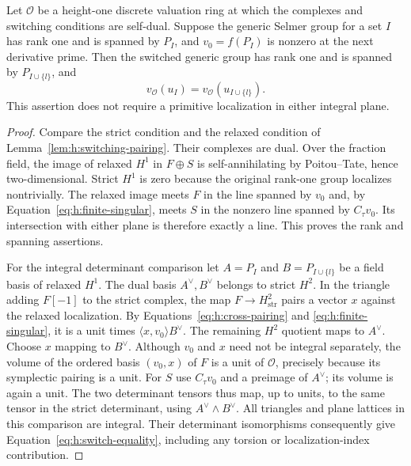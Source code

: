 \begin{lemma}
\label{lem:h:determinant-switch}
Let $\mathcal O$ be a height-one discrete valuation ring at which the
complexes and switching conditions are self-dual. Suppose the generic
Selmer group for a set $I$ has rank one and is spanned by $P_I$, and
$v_0=f(P_I)$ is nonzero at the next derivative prime. Then the switched
generic group has rank one and is spanned by $P_{I\cup\{l\}}$, and
\begin{equation}\label{eq:h:switch-equality}
 v_{\mathcal O}(u_I)=v_{\mathcal O}(u_{I\cup\{l\}}).
\end{equation}
This assertion does not require a primitive localization in either
integral plane.
\end{lemma}

\begin{proof}
Compare the strict condition and the relaxed condition of
Lemma~\ref{lem:h:switching-pairing}. Their complexes are dual. Over the
fraction field, the image of relaxed $H^1$ in $F\oplus S$ is
self-annihilating by Poitou--Tate, hence two-dimensional. Strict $H^1$ is
zero because the original rank-one group localizes nontrivially. The
relaxed image meets $F$ in the line spanned by $v_0$ and, by
Equation~\eqref{eq:h:finite-singular}, meets $S$ in the nonzero line
spanned by $C_\tau v_0$. Its intersection with either plane is therefore
exactly a line. This proves the rank and spanning assertions.

For the integral determinant comparison let $A=P_I$ and
$B=P_{I\cup\{l\}}$ be a field basis of relaxed $H^1$. The dual basis
$A^\vee,B^\vee$ belongs to strict $H^2$. In the triangle adding $F[-1]$
to the strict complex, the map $F\to H^2_{\mathrm{str}}$ pairs a vector
$x$ against the relaxed localization. By
Equations~\eqref{eq:h:cross-pairing} and
\eqref{eq:h:finite-singular}, it is a unit times
$\langle x,v_0\rangle B^\vee$. The remaining $H^2$ quotient maps to
$A^\vee$. Choose $x$ mapping to $B^\vee$. Although $v_0$ and $x$ need
not be integral separately, the volume of the ordered basis $(v_0,x)$
of $F$ is a unit of $\mathcal O$, precisely because its symplectic
pairing is a unit. For $S$ use $C_\tau v_0$ and a preimage of
$A^\vee$; its volume is again a unit. The two determinant tensors thus
map, up to units, to the same tensor in the strict determinant, using
$A^\vee\wedge B^\vee$. All triangles and plane lattices in this
comparison are integral. Their determinant isomorphisms consequently
give Equation~\eqref{eq:h:switch-equality}, including any torsion or
localization-index contribution.
\end{proof}

